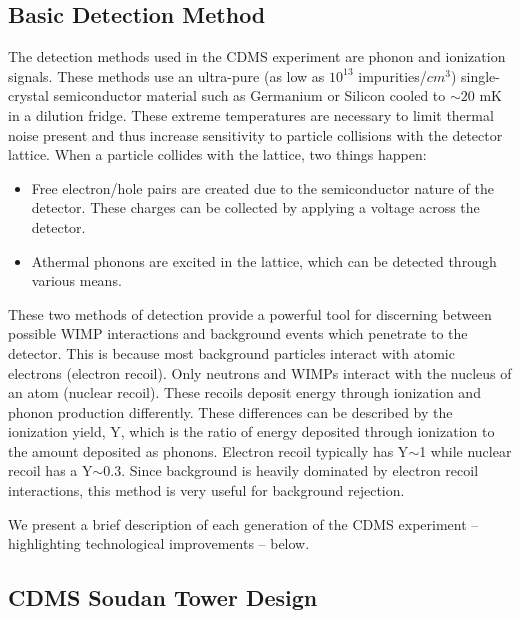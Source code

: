 \documentclass{report}
\begin{document}
\subsection{Basic Detection Method}

The detection methods used in the CDMS experiment are phonon and ionization signals. These methods use an ultra-pure (as low as $10^{13}$ impurities/$cm^3$) single-crystal semiconductor material such as Germanium or Silicon cooled to $\sim 20$ mK in a dilution fridge. These extreme temperatures are necessary to limit thermal noise present and thus increase sensitivity to particle collisions with the detector lattice. When a particle collides with the lattice, two things happen:
\begin{itemize}
\item Free electron/hole pairs are created due to the semiconductor nature of the detector. These charges can be collected by applying a voltage across the detector.
\item Athermal phonons are excited in the lattice, which can be detected through various means.
\end{itemize}

These two methods of detection provide a powerful tool for discerning between possible WIMP interactions and background events which penetrate to the detector. This is because most background particles interact with atomic electrons (electron recoil). Only neutrons and WIMPs interact with the nucleus of an atom (nuclear recoil). These recoils deposit energy through ionization and phonon production differently. These differences can be described by the ionization yield, Y, which is the ratio of energy deposited through ionization to the amount deposited as phonons. Electron recoil typically has Y$\sim$1 while nuclear recoil has a Y$\sim$0.3. Since background is heavily dominated by electron recoil interactions, this method is very useful for background rejection.

We present a brief description of each generation of the CDMS experiment -- highlighting technological improvements -- below.

\subsection{CDMS Soudan Tower Design}
\end{document}

